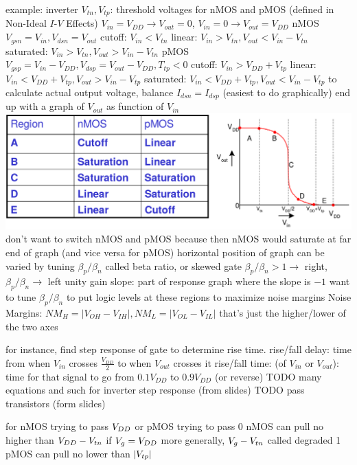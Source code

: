 \documentclass[12pt]{article}
\begin{document}
\begin{spacing}{0.8}
\begin{multicols*}{2}
\begin{flushleft}
\begin{outline}[longenum]
  \1 example: inverter
  \1 $V_{tn}, V_{tp}$: threshold voltages for nMOS and pMOS 
    (defined in Non-Ideal $I$-$V$ Effects)
  \1 $V_{in}=V_{DD} \rightarrow V_{out}=0$, $V_{in}=0 \rightarrow V_{out}=V_{DD}$
  \1 nMOS
    \2 $V_{gsn}=V_{in}, V_{dsn}=V_{out}$
    \2 cutoff:    $V_{in}<V_{tn}$
    \2 linear:    $V_{in}>V_{tn}, V_{out}<V_{in}-V_{tn}$
    \2 saturated: $V_{in}>V_{tn}, V_{out}>V_{in}-V_{tn}$
  \1 pMOS
    \2 $V_{gsp}=V_{in}-V_{DD}, V_{dsp}=V_{out}-V_{DD}, T_{tp}<0$
    \2 cutoff:    $V_{in}>V_{DD}+V_{tp}$
    \2 linear:    $V_{in}<V_{DD}+V_{tp}, V_{out}>V_{in}-V_{tp}$
    \2 saturated: $V_{in}<V_{DD}+V_{tp}, V_{out}<V_{in}-V_{tp}$
  \1 to calculate actual output voltage, balance $I_{dsn}=I_{dsp}$ (easiest to do graphically)
    \2 end up with a graph of $V_{out}$ as function of $V_{in}$
    \includegraphics[width=\columnwidth]{ecen454/DC__response_Vo_Vi_nMOS_pMOS.png}
    \2 don't want to switch nMOS and pMOS because then nMOS would saturate at far end of graph (and vice versa for pMOS)
    \2 horizontal position of graph can be varied by tuning $\beta_p / \beta_n$
      \3 called beta ratio, or skewed gate
      \3 $\beta_p / \beta_n>1 \rightarrow$ right, $\beta_p / \beta_n\rightarrow$ left
    \2 unity gain slope: part of response graph where the slope is $-1$
      \3 want to tune $\beta_p / \beta_n$ to put logic levels at these regions to maximize noise margins
    \2 Noise Margins:
      \3 $NM_H=|V_{OH}-V_{IH}|, NM_L=|V_{OL}-V_{IL}|$
      \3 that's just the higher/lower of the two axes

  \1 for instance, find step response of gate to determine rise time.
  \1 rise/fall delay: time from when $V_{in}$ crosses $\frac{V_{DD}}{2}$ to when $V_{out}$ crosses it
  \1 rise/fall time: (of $V_{in}$ or $V_{out}$): time for that signal to go from $0.1V_{DD}$ to $0.9V_{DD}$ (or reverse)
  \1 TODO many equations and such for inverter step response (from slides)
  \1 TODO pass transistors (form slides)

  \1 for nMOS trying to pass $V_{DD}$ or pMOS trying to pass 0
  \1 nMOS can pull no higher than $V_{DD}-V_{tn}$ if $V_{g}=V_{DD}$
    \2 more generally, $V_{g}-V_{tn}$
    \2 called degraded 1
  \1 pMOS can pull no lower than $|V_{tp}|$


\end{outline}
\end{flushleft}
\end{multicols*}
\end{spacing}
\end{document}
